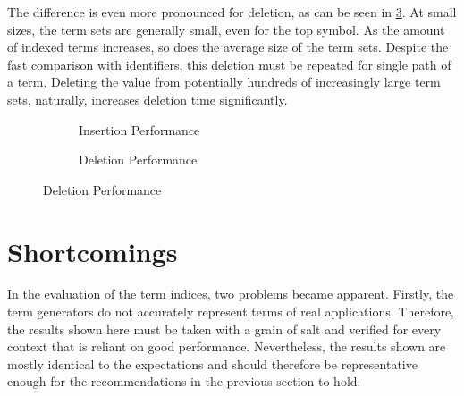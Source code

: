 The difference is even more pronounced for deletion, as can be seen in \cref{delete}. At small sizes, the term sets are generally small, even for the top symbol. As the amount of indexed terms increases, so does the average size of the term sets. Despite the fast comparison with identifiers, this deletion must be repeated for single path of a term. Deleting the value from potentially hundreds of increasingly large term sets, naturally, increases deletion time significantly.

\begin{figure}[h]
  \begin{subfigure}{0.45\textwidth}
\begin{adjustbox}{width=1\textwidth}
\end{adjustbox}
\caption{Insertion Performance}
\label{insert}
\end{subfigure}
\begin{subfigure}{0.1\textwidth}
\end{subfigure}
\begin{subfigure}{0.45\textwidth}
\begin{adjustbox}{width=1\textwidth}
\end{adjustbox}
\caption{Deletion Performance}
\label{delete}
\end{subfigure}
\end{figure}

\section{Shortcomings} \label{shortcomings}
In the evaluation of the term indices, two problems became apparent. Firstly, the term generators do not accurately represent terms of real applications. Therefore, the results shown here must be taken with a grain of salt and verified for every context that is reliant on good performance. Nevertheless, the results shown are mostly identical to the expectations and should therefore be representative enough for the recommendations in the previous section to hold.

